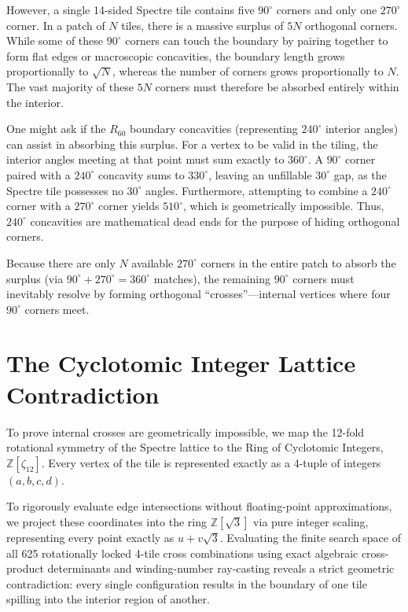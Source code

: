 \documentclass[11pt, a4paper]{amsart}
\begin{document}
However, a single 14-sided Spectre tile contains five $90^\circ$ corners and only one $270^\circ$ corner. In a patch of $N$ tiles, there is a massive surplus of $5N$ orthogonal corners. While some of these $90^\circ$ corners can touch the boundary by pairing together to form flat edges or macroscopic concavities, the boundary length grows proportionally to $\sqrt{N}$, whereas the number of corners grows proportionally to $N$. The vast majority of these $5N$ corners must therefore be absorbed entirely within the interior. 

One might ask if the $R_{60}$ boundary concavities (representing $240^\circ$ interior angles) can assist in absorbing this surplus. For a vertex to be valid in the tiling, the interior angles meeting at that point must sum exactly to $360^\circ$. A $90^\circ$ corner paired with a $240^\circ$ concavity sums to $330^\circ$, leaving an unfillable $30^\circ$ gap, as the Spectre tile possesses no $30^\circ$ angles. Furthermore, attempting to combine a $240^\circ$ corner with a $270^\circ$ corner yields $510^\circ$, which is geometrically impossible. Thus, $240^\circ$ concavities are mathematical dead ends for the purpose of hiding orthogonal corners.

Because there are only $N$ available $270^\circ$ corners in the entire patch to absorb the surplus (via $90^\circ + 270^\circ = 360^\circ$ matches), the remaining $90^\circ$ corners must inevitably resolve by forming orthogonal ``crosses''---internal vertices where four $90^\circ$ corners meet.

\section{The Cyclotomic Integer Lattice Contradiction}
To prove internal crosses are geometrically impossible, we map the 12-fold rotational symmetry of the Spectre lattice to the Ring of Cyclotomic Integers, $\mathbb{Z}[\zeta_{12}]$. Every vertex of the tile is represented exactly as a 4-tuple of integers $(a, b, c, d)$.

To rigorously evaluate edge intersections without floating-point approximations, we project these coordinates into the ring $\mathbb{Z}[\sqrt{3}]$ via pure integer scaling, representing every point exactly as $u + v\sqrt{3}$. Evaluating the finite search space of all 625 rotationally locked 4-tile cross combinations using exact algebraic cross-product determinants and winding-number ray-casting reveals a strict geometric contradiction: every single configuration results in the boundary of one tile spilling into the interior region of another.
\end{document}
